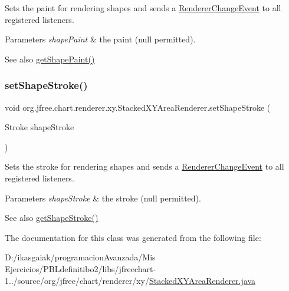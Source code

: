 Sets the paint for rendering shapes and sends a \mbox{\hyperlink{}{Renderer\+Change\+Event}} to all registered listeners.


\begin{DoxyParams}{Parameters}
{\em shape\+Paint} & the paint ({\ttfamily null} permitted).\\
\hline
\end{DoxyParams}
\begin{DoxySeeAlso}{See also}
\mbox{\hyperlink{classorg_1_1jfree_1_1chart_1_1renderer_1_1xy_1_1_stacked_x_y_area_renderer_a9c7a8202060efd770f918de1b08b1c99}{get\+Shape\+Paint()}} 
\end{DoxySeeAlso}
\mbox{\label{classorg_1_1jfree_1_1chart_1_1renderer_1_1xy_1_1_stacked_x_y_area_renderer_a8124f9930c21557b4132fc07ed7366db}} 
\subsubsection{\texorpdfstring{set\+Shape\+Stroke()}{setShapeStroke()}}
{\footnotesize\ttfamily void org.\+jfree.\+chart.\+renderer.\+xy.\+Stacked\+X\+Y\+Area\+Renderer.\+set\+Shape\+Stroke (\begin{DoxyParamCaption}\item[{Stroke}]{shape\+Stroke }\end{DoxyParamCaption})}

Sets the stroke for rendering shapes and sends a \mbox{\hyperlink{}{Renderer\+Change\+Event}} to all registered listeners.


\begin{DoxyParams}{Parameters}
{\em shape\+Stroke} & the stroke ({\ttfamily null} permitted).\\
\hline
\end{DoxyParams}
\begin{DoxySeeAlso}{See also}
\mbox{\hyperlink{classorg_1_1jfree_1_1chart_1_1renderer_1_1xy_1_1_stacked_x_y_area_renderer_a7d343ec4504d7c82a0c08d37c0e96410}{get\+Shape\+Stroke()}} 
\end{DoxySeeAlso}


The documentation for this class was generated from the following file\+:\begin{DoxyCompactItemize}
\item 
D\+:/ikasgaiak/programacion\+Avanzada/\+Mis Ejercicios/\+P\+B\+Ldefinitibo2/libs/jfreechart-\/1../source/org/jfree/chart/renderer/xy/\mbox{\hyperlink{_stacked_x_y_area_renderer_8java}{Stacked\+X\+Y\+Area\+Renderer.\+java}}\end{DoxyCompactItemize}
